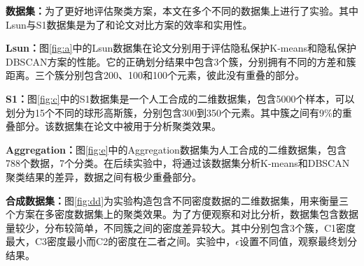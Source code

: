 \textbf{数据集：}为了更好地评估聚类方案，本文在多个不同的数据集上进行了实验。其中Lsun与S1数据集是为了和论文\cite{bozdemir2021privacy}对比方案的效率和实用性。

\begin{compactitem}
	\item \textbf{Lsun：}图\ref{fig:a}中的Lsun数据集\cite{ultsch2005clustering}在论文\cite{wu2020secure,bozdemir2021privacy}分别用于评估隐私保护K-means和隐私保护DBSCAN方案的性能。它的正确划分结果中包含3个簇，分别拥有不同的方差和簇距离。三个簇分别包含200、100和100个元素，彼此没有重叠的部分。
	\item
	\textbf{S1：}图\ref{fig:c}中的S1数据集\cite{franti2018k}是一个人工合成的二维数据集，包含5000个样本，可以划分为15个不同的球形高斯簇，分别包含300到350个元素。其中簇之间有9\%的重叠部分。该数据集在论文\cite{bozdemir2021privacy,mohassel2019practical,su2007privacy}中被用于分析聚类效果。
	\item
	\textbf{Aggregation：}图\ref{fig:e}中的Aggregation数据集\cite{gionis2007clustering}为人工合成的二维数据集，包含788个数据，7个分类。在后续实验中，将通过该数据集分析K-means和DBSCAN聚类结果的差异，数据之间有极少重叠部分。
	\item
	\textbf{合成数据集：}图\ref{fig:dd}为实验构造包含不同密度数据的二维数据集，用来衡量三个方案在多密度数据集上的聚类效果。为了方便观察和对比分析，数据集包含数据量较少，分布较简单，不同簇之间的密度差异较大。其中分别包含3个簇，C1密度最大，C3密度最小而C2的密度在二者之间。实验中，$ \epsilon $设置不同值，观察最终划分结果。
\end{compactitem}

